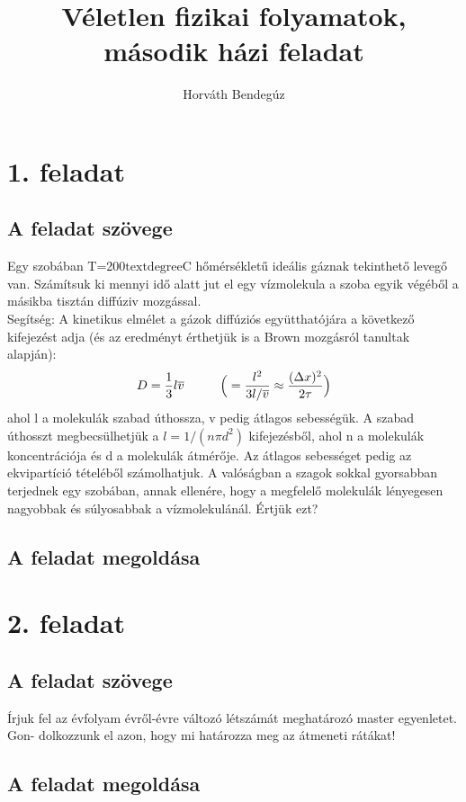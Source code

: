 \documentclass[12pt]{article}
\title{Véletlen fizikai folyamatok, második házi feladat}
\author{Horváth Bendegúz}
\begin{document}
\maketitle
\section*{1. feladat}
\subsection*{A feladat szövege}
Egy szobában T=200$\text{textdegree{C}}$ hőmérsékletű ideális gáznak tekinthető levegő van. Számítsuk
ki mennyi idő alatt jut el egy vízmolekula a szoba egyik végéből a másikba tisztán diffúziv mozgással.\\
Segítség:
A kinetikus elmélet a gázok diffúziós együtthatójára a következő kifejezést adja (és az eredményt érthetjük is a Brown mozgásról tanultak alapján):
$$ D = \frac{1}{3}l\overline{v}\hspace{1 cm}\Big (= \frac{l^2}{3l/\overline{v}}\approx\frac{(\Delta x)^2}{2\tau}\Big )$$
     ahol l a molekulák szabad úthossza, v pedig átlagos sebességük. A szabad úthosszt megbecsülhetjük a $l = 1/(n\pi d^2)$ kifejezésből, ahol n a molekulák koncentrációja és d a molekulák átmérője. Az átlagos sebességet pedig az ekvipartíció tételéből számolhatjuk.
A valóságban a szagok sokkal gyorsabban terjednek egy szobában, annak ellenére, hogy a megfelelő molekulák lényegesen nagyobbak és súlyosabbak a vízmolekulánál. Értjük ezt?


\subsection*{A feladat megoldása}


\newpage
\section*{2. feladat}
\subsection*{A feladat szövege}
Írjuk fel az évfolyam évről-évre változó létszámát meghatározó master egyenletet. Gon-
dolkozzunk el azon, hogy mi határozza meg az átmeneti rátákat!

\subsection*{A feladat megoldása}
\end{document}
